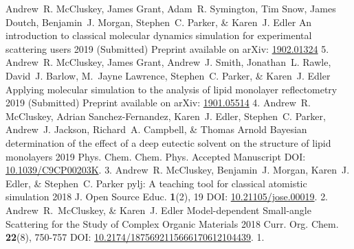 \begin{cvpubys}
  \cvpuby
    {Andrew~R. McCluskey, James Grant, Adam~R. Symington, Tim Snow, James Doutch, Benjamin~J. Morgan, Stephen~C. Parker, \& Karen~J. Edler}
    {An introduction to classical molecular dynamics simulation for experimental scattering users}
    {2019}
    {(Submitted)}
    {Preprint available on arXiv: \href{https://arxiv.org/abs/1902.01324}{1902.01324}}
    {}
    {5.}
  \cvpuby
    {Andrew~R. McCluskey, James Grant, Andrew~J. Smith, Jonathan~L. Rawle, David~J. Barlow, M.~Jayne Lawrence, Stephen~C. Parker, \& Karen~J. Edler}
    {Applying molecular simulation to the analysis of lipid monolayer
    reflectometry}
    {2019}
    {(Submitted)}
    {Preprint available on arXiv: \href{https://arxiv.org/abs/1901.05514}{1901.05514}}
    {}
    {4.}
  \cvpuby
    {Andrew~R. McCluskey, Adrian Sanchez-Fernandez, Karen~J. Edler, Stephen~C. Parker, Andrew~J. Jackson, Richard~A. Campbell, \& Thomas Arnold}
    {Bayesian determination of the effect of a deep eutectic solvent on the structure of lipid monolayers}
    {2019}
    {Phys. Chem. Chem. Phys.}
    {Accepted Manuscript}
    {DOI: \href{https://doi.org/10.1039/C9CP00203K}{10.1039/C9CP00203K}.}
    {3.}
  \cvpuby
    {Andrew~R. McCluskey, Benjamin~J. Morgan, Karen~J. Edler, \& Stephen~C. Parker}
    {pylj: A teaching tool for classical atomistic simulation}
    {2018}
    {J. Open Source Educ.}
    {\textbf{1}(2), 19}
    {DOI: \href{http://doi.org/10.21105/jose.00019}{10.21105/jose.00019}.}
    {2.}
  \cvpuby
    {Andrew~R.~McCluskey, \& Karen~J. Edler}
    {Model-dependent Small-angle Scattering for the Study of Complex Organic Materials}
    {2018}
    {Curr. Org. Chem.}
    {\textbf{22}(8), 750-757}
    {DOI: \href{http://doi.org/10.2174/1875692115666170612104439}{10.2174/1875692115666170612104439}.}
    {1.}
\end{cvpubys}
